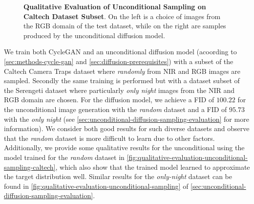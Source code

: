 \begin{figure}[htp!]
\begin{tabularx}{.7\textwidth}{Y Y Y !{\space} Y Y Y}
    \end{tabularx}
    \caption{
        \textbf{Qualitative Evaluation of Unconditional Sampling on Caltech Dataset Subset}.
        On the left is a choice of images from the RGB domain of the test dataset, while on the right are samples produced by the unconditional diffusion model.
    }
    \label{fig:qualitative-evaluation-unconditional-sampling-caltech}
\end{figure}

We train both CycleGAN and an unconditional diffusion model (acoording to \autoref{sec:methods-cycle-gan} and \autoref{sec:diffusion-prerequisites}) with a subset of the Caltech Camera Traps dataset \parencite{caltech} where \textit{randomly} from NIR and RGB images are sampled.
Secondly the same training is performed but with a dataset subset of the Serengeti dataset \parencite{serengeti} where particularly \textit{only night} images from the NIR and RGB domain are chosen.
For the diffusion model,
we achieve a FID of $100.22$ for the unconditional image generation with the \textit{random} dataset and a FID of $95.73$ with the \textit{only night} (see \autoref{sec:unconditional-diffusion-sampling-evaluation} for more information).
We consider both good results for such diverse datasets and observe that the \textit{random} dataset is more difficult to learn due to other factors.
Additionally, we provide some qualitative results for the unconditional using the model trained for the \textit{random} dataset in \autoref{fig:qualitative-evaluation-unconditional-sampling-caltech},
which also show that the trained model learned to approximate the target distribution well.
Similar results for the \textit{only-night} dataset can be found in \autoref{fig:qualitative-evaluation-unconditional-sampling} of \autoref{sec:unconditional-diffusion-sampling-evaluation}.



